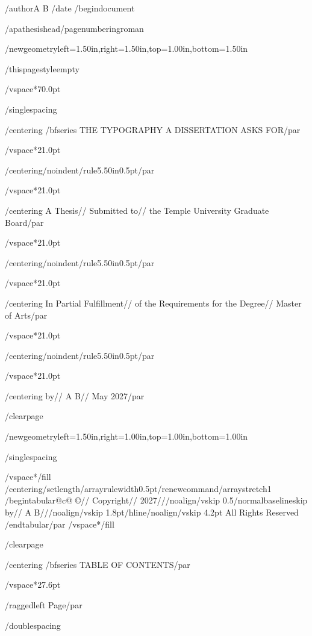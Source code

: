 /author{A B}
/date{}
/begin{document}


/apathesishead/pagenumbering{roman}

/newgeometry{left=1.50in,right=1.50in,top=1.00in,bottom=1.50in}

/thispagestyle{empty}

/vspace*{70.0pt}

/singlespacing

{/centering
/bfseries THE TYPOGRAPHY A DISSERTATION ASKS FOR/par}

/vspace*{21.0pt}

{/centering/noindent/rule{5.50in}{0.5pt}/par}

/vspace*{21.0pt}

{/centering
A Thesis//
Submitted to//
the Temple University Graduate Board/par}

/vspace*{21.0pt}

{/centering/noindent/rule{5.50in}{0.5pt}/par}

/vspace*{21.0pt}

{/centering
In Partial Fulfillment//
of the Requirements for the Degree//
Master of Arts/par}

/vspace*{21.0pt}

{/centering/noindent/rule{5.50in}{0.5pt}/par}

/vspace*{21.0pt}

{/centering
by//
A B//
May 2027/par}

/clearpage

/newgeometry{left=1.50in,right=1.00in,top=1.00in,bottom=1.00in}

/singlespacing

/vspace*{/fill}
{/centering/setlength{/arrayrulewidth}{0.5pt}/renewcommand{/arraystretch}{1}
/begin{tabular}{@{}c@{}}
©//
Copyright//
2027///noalign{/vskip 0.5/normalbaselineskip}
by//
A B///noalign{/vskip 1.8pt}/hline/noalign{/vskip 4.2pt}
All Rights Reserved
/end{tabular}/par}
/vspace*{/fill}

/clearpage

{/centering
/bfseries TABLE OF CONTENTS/par}

/vspace*{27.6pt}

{/raggedleft
Page/par}

/doublespacing

